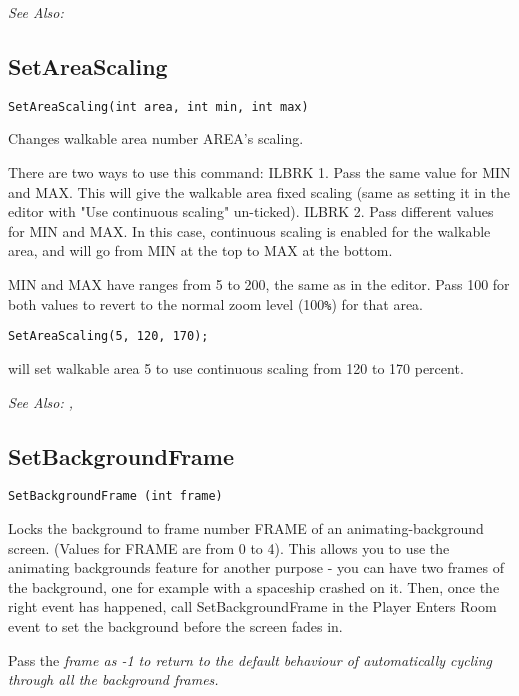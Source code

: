 \it{See Also:} 


\subsection{SetAreaScaling}\label{SetAreaScaling}%

\begin{verbatim}
SetAreaScaling(int area, int min, int max)
\end{verbatim}
Changes walkable area number AREA's scaling.

There are two ways to use this command: ILBRK
1. Pass the same value for MIN and MAX. This will give the walkable area fixed
scaling (same as setting it in the editor with "Use continuous scaling" un-ticked). ILBRK
2. Pass different values for MIN and MAX. In this case, continuous scaling is
enabled for the walkable area, and will go from MIN at the top to MAX at the bottom.

MIN and MAX have ranges from 5 to 200, the same as in the editor. Pass 100 for both values
to revert to the normal zoom level (100\verb$%$) for that area.

\begin{verbatim}
SetAreaScaling(5, 120, 170);
\end{verbatim}
will set walkable area 5 to use continuous scaling from 120 to 170 percent.

\it{See Also:} , 


\subsection{SetBackgroundFrame}\label{SetBackgroundFrame}%

\begin{verbatim}
SetBackgroundFrame (int frame)
\end{verbatim}
Locks the background to frame number FRAME of an animating-background
screen. (Values for FRAME are from 0 to 4). This allows you to use the
animating backgrounds feature for another purpose - you can have two
frames of the background, one for example with a spaceship crashed on it.
Then, once the right event has happened, call SetBackgroundFrame in the
Player Enters Room event to set the background before the screen fades in.

Pass the \it{frame} as -1 to return to the default behaviour of automatically
cycling through all the background frames.

